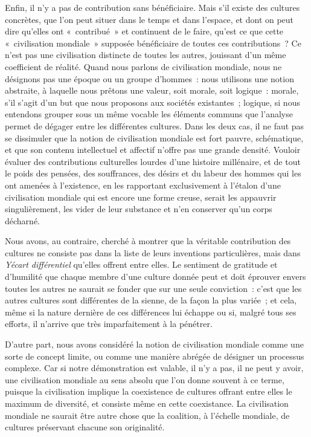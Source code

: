 \documentclass[french,twoside]{book} %
\begin{document}
Enfin, il n’y a pas de contribution sans bénéficiaire. Mais s’il existe des cultures concrètes, que l’on peut situer dans le temps et dans l’espace, et dont on peut dire qu’elles ont « contribué » et continuent de le faire, qu’est ce que cette « civilisation mondiale » supposée bénéficiaire de toutes ces contributions ? Ce n’est pas une civilisation distincte de toutes les autres, jouissant d’un même coefficient de réalité. Quand nous parlons de civilisation mondiale, nous ne désignons pas une époque ou un groupe d’hommes : nous utilisons une notion abstraite, à laquelle nous prêtons une valeur, soit morale, soit logique : morale, s’il s’agit d’un but que nous proposons aux sociétés existantes ; logique, si nous entendons grouper sous un même vocable les éléments communs que l’analyse permet de dégager entre les différentes cultures. Dans les deux cas, il ne faut pas se dissimuler que la notion de civilisation mondiale est fort pauvre, schématique, et que son contenu intellectuel et affectif n’offre pas une grande densité. Vouloir évaluer des contributions culturelles lourdes d’une histoire millénaire, et de tout le poids des pensées, des souffrances, des désirs et du labeur des hommes qui les ont amenées à l’existence, en les rapportant exclusivement à l’étalon d’une civilisation mondiale qui est encore une forme creuse, serait les appauvrir singulièrement, les vider de leur substance et n’en conserver qu’un corps décharné.\par
Nous avons, au contraire, cherché à montrer que la véritable contribution des cultures ne consiste pas dans la liste de leurs inventions particulières, mais dans \emph{Yécart différentiel} qu’elles offrent entre elles. Le sentiment de gratitude et d’humilité que chaque membre d’une culture donnée peut et doit éprouver envers toutes les autres ne saurait se fonder que sur une seule conviction : c’est que les autres cultures sont différentes de la sienne, de la façon la plus variée ; et cela, même si la nature dernière de ces différences lui échappe ou si, malgré tous ses efforts, il n’arrive que très imparfaitement à la pénétrer.\par
D’autre part, nous avons considéré la notion de civilisation mondiale comme une sorte de concept limite, ou comme une manière abrégée de désigner un processus complexe. Car si notre démonstration est valable, il n’y a pas, il ne peut y avoir, une civilisation mondiale au sens absolu que l’on donne souvent à ce terme, puisque la civilisation implique la coexistence de cultures offrant entre elles le maximum de diversité, et consiste même en cette coexistance. La civilisation mondiale ne saurait être autre chose que la coalition, à l’échelle mondiale, de cultures préservant chacune son originalité.
\end{document}
